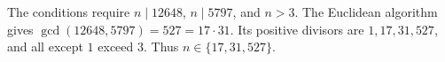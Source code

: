 The conditions require $n\mid12648$, $n\mid5797$, and $n>3$. The Euclidean algorithm gives $\gcd(12648,5797)=527=17\cdot31$. Its positive divisors are $1,17,31,527$, and all except $1$ exceed $3$. Thus $\boxed{n\in\{17,31,527\}}$.
